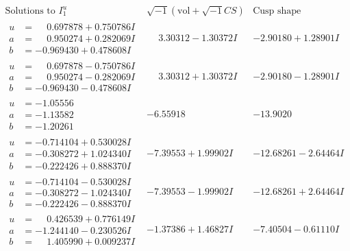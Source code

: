 \documentclass[1p]{elsarticle_modified}
\theoremstyle{definition}
\newcommand{\I}{\sqrt{-1}}
\begin{document}
$$\begin{array}{c|c|c}  
\text{Solutions to }I^u_{1}& \I (\text{vol} + \sqrt{-1}CS) & \text{Cusp shape}\\
 \hline 
\begin{aligned}
u &= \phantom{-}0.697878 + 0.750786 I \\
a &= \phantom{-}0.950274 + 0.282069 I \\
b &= -0.969430 + 0.478608 I\end{aligned}
 & \phantom{-}3.30312 - 1.30372 I & -2.90180 + 1.28901 I \\ \hline\begin{aligned}
u &= \phantom{-}0.697878 - 0.750786 I \\
a &= \phantom{-}0.950274 - 0.282069 I \\
b &= -0.969430 - 0.478608 I\end{aligned}
 & \phantom{-}3.30312 + 1.30372 I & -2.90180 - 1.28901 I \\ \hline\begin{aligned}
u &= -1.05556\phantom{ +0.000000I} \\
a &= -1.13582\phantom{ +0.000000I} \\
b &= -1.20261\phantom{ +0.000000I}\end{aligned}
 & -6.55918\phantom{ +0.000000I} & -13.9020\phantom{ +0.000000I} \\ \hline\begin{aligned}
u &= -0.714104 + 0.530028 I \\
a &= -0.308272 + 1.024340 I \\
b &= -0.222426 + 0.888370 I\end{aligned}
 & -7.39553 + 1.99902 I & -12.68261 - 2.64464 I \\ \hline\begin{aligned}
u &= -0.714104 - 0.530028 I \\
a &= -0.308272 - 1.024340 I \\
b &= -0.222426 - 0.888370 I\end{aligned}
 & -7.39553 - 1.99902 I & -12.68261 + 2.64464 I \\ \hline\begin{aligned}
u &= \phantom{-}0.426539 + 0.776149 I \\
a &= -1.244140 - 0.230526 I \\
b &= \phantom{-}1.405990 + 0.009237 I\end{aligned}
 & -1.37386 + 1.46827 I & -7.40504 - 0.61110 I \\ \hline\begin{aligned}

\end{aligned}
\end{array}$$
\end{document}
